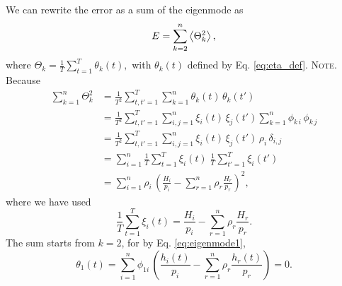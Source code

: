 \documentclass[reprint, floatfix]{revtex4-1}
\newcommand{\note}[1]{{\color{DarkGreen}\footnotesize \textsc{Note.} #1}}
\begin{document}
We can rewrite the error as
a sum of the eigenmode as
%
\begin{align}
  E
  =
  \sum_{ k = 2 }^n
    \left\langle
      \Theta_k^2
    \right\rangle
  ,
\notag
\end{align}
%
where
%
$
  \Theta_k
  =
  \frac{ 1 } { T }
  \sum_{ t = 1 } ^ T
    \theta_k( t )
  ,
$
%
with $\theta_k(t)$ defined by Eq. \eqref{eq:eta_def}.
%
\note{Because
%
\begin{align*}
  \sum_{ k = 1 }^n
    \Theta_k^2
  &=
  \frac{ 1 } { T^2 }
  \sum_{ t, t' = 1 }^T
    \sum_{ k = 1 }^n
      \theta_k( t ) \, \theta_k( t' )
  \\
  &=
  \frac{ 1 } { T^2 }
  \sum_{ t, t' = 1 }^T
    \sum_{ i, j = 1 }^n
      \xi_i(t) \, \xi_j(t')
      \sum_{ k = 1 }^n
        \phi_{k \, i} \, \phi_{k \, j}
  \\
  &=
  \frac{ 1 } { T^2 }
  \sum_{ t, t' = 1 }^T
    \sum_{ i, j = 1 }^n
      \xi_i(t) \, \xi_j(t') \,
      \rho_i \, \delta_{i, j}
  \\
  &=
  \sum_{ i = 1 }^n
  \frac{ 1 } { T }
  \sum_{ t = 1 }^T \xi_i(t)
  \;
  \frac{ 1 } { T }
  \sum_{ t' = 1 }^T \xi_i(t')
  \\
  &=
  \sum_{ i = 1 }^n
    \rho_i \,
      \left(
        \frac{ H_i }
             { p_i }
        -
        \sum_{r = 1}^n \rho_r
        \frac{ H_r }
             { p_r }
      \right)^2
  ,
\end{align*}
where we have used
$$
  \frac{1}{T}
  \sum_{t = 1}^T \xi_i(t)
  =
  \frac{ H_i }
       { p_i }
  -
  \sum_{r = 1}^n \rho_r
  \frac{ H_r }
       { p_r }
  .
$$
}%
The sum starts from $k = 2$, for
by Eq. \eqref{eq:eigenmode1}, %
$$
\theta_1(t)
=
\sum_{ i = 1 }^n
  \phi_{1i} \, \left(
    \frac{ h_i(t) } { p_i }
    -
    \sum_{r = 1}^n
    \rho_r
    \frac{ h_r(t) } { p_r }
  \right)
= 0.
$$
\end{document}
